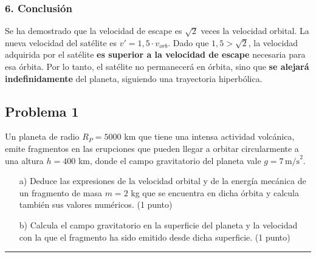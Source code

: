 \subsubsection*{6. Conclusión}
\begin{cajaconclusion}
Se ha demostrado que la velocidad de escape es $\sqrt{2}$ veces la velocidad orbital. La nueva velocidad del satélite es $v' = 1,5 \cdot v_{orb}$. Dado que $1,5 > \sqrt{2}$, la velocidad adquirida por el satélite \textbf{es superior a la velocidad de escape} necesaria para esa órbita. Por lo tanto, el satélite no permanecerá en órbita, sino que \textbf{se alejará indefinidamente} del planeta, siguiendo una trayectoria hiperbólica.
\end{cajaconclusion}

\newpage

\subsection{Problema 1}
\label{subsec:P1_2022_jun_ord}

\begin{cajaenunciado}
Un planeta de radio $R_P = 5000$ km que tiene una intensa actividad volcánica, emite fragmentos en las erupciones que pueden llegar a orbitar circularmente a una altura $h=400$ km, donde el campo gravitatorio del planeta vale $g=7\,\text{m/s}^2$.
\begin{enumerate}
    \item[a)] Deduce las expresiones de la velocidad orbital y de la energía mecánica de un fragmento de masa $m=2$ kg que se encuentra en dicha órbita y calcula también sus valores numéricos. (1 punto) 
    \item[b)] Calcula el campo gravitatorio en la superficie del planeta y la velocidad con la que el fragmento ha sido emitido desde dicha superficie. (1 punto) 
\end{enumerate}
\end{cajaenunciado}
\hrule


